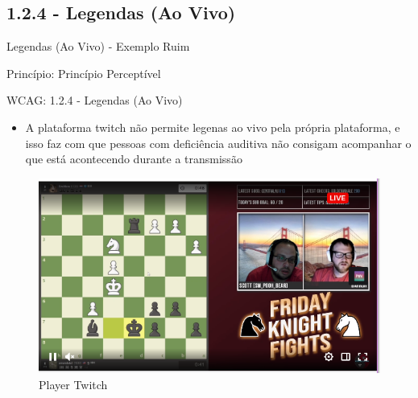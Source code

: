 \documentclass{beamer}
\begin{document}
\subsection{1.2.4 - Legendas (Ao Vivo)}

\begin{frame}{Legendas (Ao Vivo) - Exemplo Ruim}

Princípio: Princípio Perceptível

WCAG: 1.2.4 - Legendas (Ao Vivo)

\begin{itemize}
	\item A plataforma twitch não permite legenas ao vivo pela própria plataforma, e isso faz com que pessoas com deficiência auditiva não consigam acompanhar o que está acontecendo durante a transmissão
\end{itemize}
\begin{figure}
    \centering
    \includegraphics[scale=0.3]{images/no_subtitle.png}
    \caption{Player Twitch}
\end{figure}

\end{frame}
\end{document}

